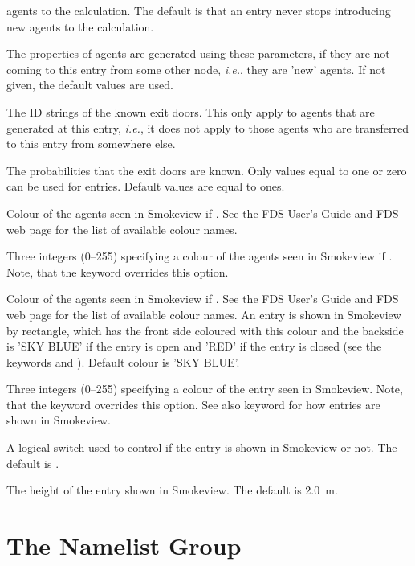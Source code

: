 \documentclass[12pt,a4paper,final,twoside]{stylevk}
\begin{document}
\begin{description}
  agents to the calculation.  The default is that an entry never stops
  introducing new agents to the calculation.
%
\item[\Timtt{PERS\_ID}] The properties of agents are generated using
  these parameters, if they are not coming to this entry from some
  other node, \emph{i.e.}, they are 'new' agents.  If not given, the
  default values are used.
%
\item[\Timts{KNOWN\_DOOR\_NAMES}] The ID strings of the known exit
  doors.  This only apply to agents that are generated at this entry,
  \emph{i.e.}, it does not apply to those agents who are transferred to
  this entry from somewhere else.
%
\item[\Timts{KNOWN\_DOOR\_PROBS}] The probabilities that the exit
  doors are known.  Only values equal to one or zero can be used for
  entries.  Default values are equal to ones.
%
\item[\Timts{AVATAR\_COLOR}] Colour of the agents seen in Smokeview if
  .  See the FDS User's Guide and FDS web page
  for the list of available colour names. 
%
\item[\Timts{AVATAR\_RGB}] Three integers (0--255) specifying a colour
  of the agents seen in Smokeview if .  Note,
  that the  keyword overrides this option.
%
\item[\Timts{COLOR}] Colour of the agents seen in Smokeview if
  .  See the FDS User's Guide and FDS web page
  for the list of available colour names.  An entry is shown in
  Smokeview by rectangle, which has the front side coloured with this
  colour and the backside is 'SKY BLUE' if the entry is open and 'RED'
  if the entry is closed (see the keywords  and
  ).  Default colour is 'SKY BLUE'.
%
\item[\Timts{RGB}] Three integers (0--255) specifying a colour of the
  entry seen in Smokeview.  Note, that the  keyword
  overrides this option.  See also  keyword for how
  entries are shown in Smokeview.
%
\item[\Timts{SHOW}] A logical switch used to control if the entry is
  shown in Smokeview or not.  The default is .
%
\item[\Timts{HEIGHT}] The height of the entry shown in Smokeview.  The
  default is 2.0~m.
%
\end{description}


\section{The  Namelist Group}\label{Sec_DoorNML}
\end{document}
